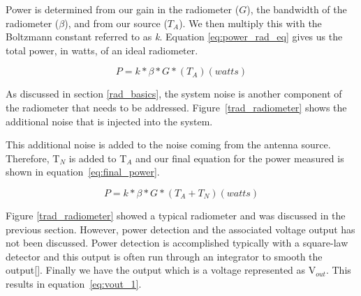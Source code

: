 


Power is determined from our gain in the radiometer ($G$), the bandwidth of the radiometer ($\beta$), and from our source ($T_{A}$).  We then multiply this with the Boltzmann constant referred to as \textit{k}. Equation \ref{eq:power_rad_eq} gives us the total power, in watts, of an ideal radiometer.

\begin{equation} \label{eq:power_rad_eq}
P=k*\beta*G*(T_{A}) (watts)
\end{equation}

As discussed in section \ref{rad_basics}, the system noise is another component of the radiometer that needs to be addressed.  Figure~\ref{trad_radiometer} shows the additional noise that is injected into the system.


This additional noise is added to the noise coming from the antenna source.  Therefore, T$_{N}$ is added to T$_{A}$ and our final equation for the power measured is shown in equation~\ref{eq:final_power}.  

\begin{equation} \label{eq:final_power}
P=k*\beta*G*(T_{A}+T_{N}) (watts)
\end{equation}

Figure \ref{trad_radiometer} showed a typical radiometer and was discussed in the previous section.  However, power detection and the associated voltage output has not been discussed.  Power detection is accomplished typically with a square-law detector and this output is often run through an integrator to smooth the output[\cite{Leinweber}].  Finally we have the output which is a voltage represented as V$_{out}$.  This results in equation~\ref{eq:vout_1}.


